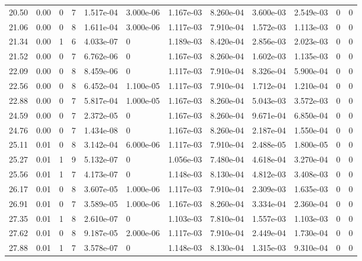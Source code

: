 \documentclass[preview]{standalone}
\begin{document}
{{{\begin{tabular}{L{1.2cm}C{1.2cm} C{0.3cm}C{0.5cm} C{1.4cm}C{1.4cm} C{1.4cm}C{1.4cm} C{1.6cm}C{1.6cm} C{1.6cm}C{1.6cm}}
  20.50  &  0.00  & 0     &  7 &  1.517e-04  & 3.000e-06  &  1.167e-03&   8.260e-04& 3.600e-03 & 2.549e-03   &  0 & 0  \\ 
  21.06  &  0.00  & 0     &  8 &  1.611e-04  & 3.000e-06  &  1.117e-03&   7.910e-04& 1.572e-03 & 1.113e-03   &  0 & 0  \\ 
  21.34  &  0.00  & 1     &  6 &  4.033e-07  & 0  &  1.189e-03&   8.420e-04& 2.856e-03 & 2.023e-03   &  0 & 0  \\ 
  21.52  &  0.00  & 0     &  7 &  6.762e-06  & 0  &  1.167e-03&   8.260e-04& 1.602e-03 & 1.135e-03   &  0 & 0  \\ 
  22.09  &  0.00  & 0     &  8 &  8.459e-06  & 0  &  1.117e-03&   7.910e-04& 8.326e-04 & 5.900e-04   &  0 & 0  \\ 
  22.56  &  0.00  & 0     &  8 &  6.452e-04  & 1.100e-05  &  1.117e-03&   7.910e-04& 1.712e-04 & 1.210e-04   &  0 & 0  \\ 
  22.88  &  0.00  & 0     &  7 &  5.817e-04  & 1.000e-05  &  1.167e-03&   8.260e-04& 5.043e-03 & 3.572e-03   &  0 & 0  \\ 
  24.59  &  0.00  & 0     &  7 &  2.372e-05  & 0  &  1.167e-03&   8.260e-04& 9.671e-04 & 6.850e-04   &  0 & 0  \\ 
  24.76  &  0.00  & 0     &  7 &  1.434e-08  & 0  &  1.167e-03&   8.260e-04& 2.187e-04 & 1.550e-04   &  0 & 0  \\ 
  25.11  &  0.01  & 0     &  8 &  3.142e-04  & 6.000e-06  &  1.117e-03&   7.910e-04& 2.488e-05 & 1.800e-05   &  0 & 0  \\ 
  25.27  &  0.01  & 1     &  9 &  5.132e-07  & 0  &  1.056e-03&   7.480e-04& 4.618e-04 & 3.270e-04   &  0 & 0  \\ 
  25.56  &  0.01  & 1     &  7 &  4.173e-07  & 0  &  1.148e-03&   8.130e-04& 4.812e-03 & 3.408e-03   &  0 & 0  \\ 
  26.17  &  0.01  & 0     &  8 &  3.607e-05  & 1.000e-06  &  1.117e-03&   7.910e-04& 2.309e-03 & 1.635e-03   &  0 & 0  \\ 
  26.91  &  0.01  & 0     &  7 &  3.589e-05  & 1.000e-06  &  1.167e-03&   8.260e-04& 3.334e-04 & 2.360e-04   &  0 & 0  \\ 
  27.35  &  0.01  & 1     &  8 &  2.610e-07  & 0  &  1.103e-03&   7.810e-04& 1.557e-03 & 1.103e-03   &  0 & 0  \\ 
  27.62  &  0.01  & 0     &  8 &  9.187e-05  & 2.000e-06  &  1.117e-03&   7.910e-04& 2.449e-04 & 1.730e-04   &  0 & 0  \\ 
  27.88  &  0.01  & 1     &  7 &  3.578e-07  & 0  &  1.148e-03&   8.130e-04& 1.315e-03 & 9.310e-04   &  0 & 0  \\ 

\end{tabular}}}}
\end{document}
